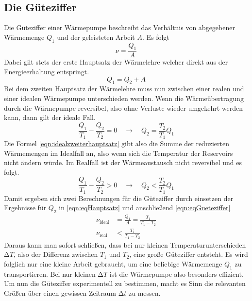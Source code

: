\subsection{Die Güteziffer}
\label{sec:Gueteziffer}
Die Güteziffer einer Wärmepumpe beschreibt das Verhältnis von abgegebener Wärmemenge $Q_{1}$ und der geleisteten Arbeit $A$. Es folgt
\begin{equation}
\label{eqn:eqGueteziffer}
\nu = \frac{Q_{1}}{A}
\end{equation}
Dabei gilt stets der erste Hauptsatz der Wärmelehre welcher direkt aus der Energieerhaltung entspringt.
\begin{equation}
\label{eqn:eqHauptsatz}
Q_{1} = Q_{2} + A
\end{equation}
Bei dem zweiten Hauptsatz der Wärmelehre muss nun zwischen einer realen und einer idealen Wärmepumpe unterschieden werden.
Wenn die Wärmeübertragung durch die Wärmepumpe reversibel, also ohne Verluste wieder umgekehrt werden kann, dann gilt der ideale Fall.
\begin{equation}
\label{eqn:idealzweiterhauptsatz}
\frac{Q_{1}}{T_{1}} - \frac{Q_{2}}{T_{2}} = 0 \quad \to \quad Q_{2} = \frac{T_{2}}{T_{1}} Q_{1}
\end{equation}
Die Formel \eqref{eqn:idealzweiterhauptsatz} gibt also die Summe der reduzierten Wärmemengen im Idealfall an, also wenn sich die Temperatur der Reservoirs nicht ändern würde.
Im Realfall ist der Wärmeaustausch nicht reversibel und es folgt.
\begin{equation}
\label{eqn:realzweiterhauptsatz}
\frac{Q_{1}}{T_{1}} - \frac{Q_{2}}{T_{2}} > 0 \quad \to \quad Q_{2} < \frac{T_{2}}{T_{1}} Q_{1}
\end{equation}
Damit ergeben sich zwei Berechnungen für die Güteziffer durch einsetzen der Ergebnisse für $Q_{2}$ in \eqref{eqn:eqHauptsatz} und anschließend \eqref{eqn:eqGueteziffer}
\begin{align}
\nu_{\text{ideal}} &= \frac{Q_{1}}{A} = \frac{T_{1}}{T_{1}-T_{2}} \label{eqn:idealgueteziffer}\\
\nu_{\text{real}} &< \frac{T_{1}}{T_{1}-T_{2}} \label{eqn:realgueteziffer}
\end{align}
Daraus kann man sofort schließen, dass bei nur kleinen Temperaturunterschieden $\increment T$, also der Differenz zwischen $T_{1}$ und $T_{2}$, eine große Güteziffer
entsteht. Es wird folglich nur eine kleine Arbeit gebraucht, um eine beliebige Wärmemenge $Q_{1}$ zu transportieren. Bei nur kleinen $\increment T$ ist die Wärmepumpe also 
besonders effizient.
Um nun die Güteziffer experimentell zu bestimmen, macht es Sinn die relevanten Größen über einen gewissen Zeitraum $\increment t$ zu messen.
